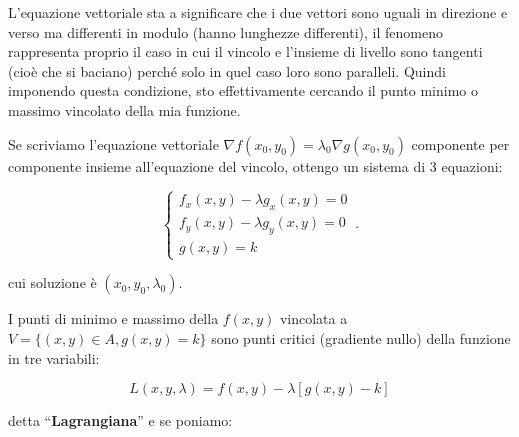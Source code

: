 \documentclass[../appunti-analisi.tex]{subfiles}
\begin{document}
\newpage


L'equazione vettoriale sta a significare che i due vettori sono uguali in direzione e verso ma differenti in modulo (hanno lunghezze differenti), il fenomeno rappresenta proprio il caso in cui il vincolo e l'insieme di livello sono tangenti (cioè che si baciano) perché solo in quel caso loro sono paralleli. Quindi imponendo questa condizione, sto effettivamente cercando il punto minimo o massimo vincolato della mia funzione.


Se scriviamo l'equazione vettoriale $\nabla f(x_0,y_0) = \lambda_0 \nabla g(x_0,y_0)$ componente per componente insieme all'equazione del vincolo, ottengo un sistema di 3 equazioni:

\begin{equation}\label{eq:lagrangiana}
    \begin{cases}
           f_x(x,y) - \lambda g_x(x,y) = 0\\
           f_y(x,y) - \lambda g_y(x,y) = 0\\
           g(x,y) =k
    \end{cases}\,.
\end{equation}

cui soluzione è $(x_0,y_0,\lambda_0)$. 

I punti di minimo e massimo della $f(x,y)$ vincolata a $V= \{(x,y) \in A, g(x,y) = k\}$ sono punti critici (gradiente nullo) della funzione in tre variabili:

\[
    L(x,y,\lambda) = f(x,y) - \lambda [g(x,y) -k]
\]

detta ``\textbf{Lagrangiana}'' e se poniamo:
\end{document}
